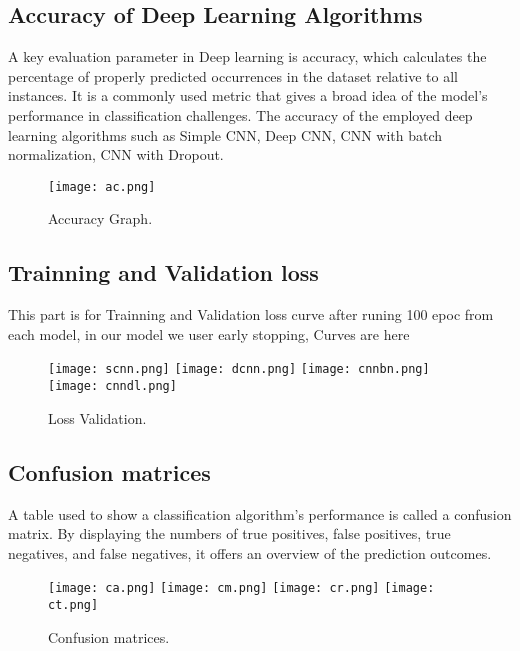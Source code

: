 \documentclass[conference]{IEEEtran}
\begin{document}
\subsection{Accuracy of Deep Learning Algorithms}
A key evaluation parameter in Deep learning is accuracy, which calculates the percentage of properly predicted occurrences in the dataset relative to all instances. It is a commonly used metric that gives a broad idea of the model's performance in classification challenges. The accuracy of the employed deep learning algorithms such as Simple CNN, Deep CNN, CNN with batch normalization, CNN with Dropout.

\begin{figure}[h]
  \centering
  \texttt{[image: ac.png]}
  \caption{Accuracy Graph.}
  \label{fig:your_label}
\end{figure}

\subsection{Trainning and Validation loss}
This part is for Trainning and Validation loss curve after runing 100 epoc from each model, in our model we user early stopping, Curves are here

\begin{figure}[h]
  \centering
  \texttt{[image: scnn.png]}
  \texttt{[image: dcnn.png]}
  \texttt{[image: cnnbn.png]}
  \texttt{[image: cnndl.png]}
  \caption{Loss Validation.}
  \label{fig:your_label}
\end{figure}

\subsection{Confusion matrices}

A table used to show a classification algorithm's performance is called a confusion matrix. By displaying the numbers of true positives, false positives, true negatives, and false negatives, it offers an overview of the prediction outcomes.

\begin{figure}[h]
  \centering
  \texttt{[image: ca.png]}
  \texttt{[image: cm.png]}
  \texttt{[image: cr.png]}
  \texttt{[image: ct.png]}
  \caption{Confusion matrices.}
  \label{fig:your_label}
\end{figure}
\end{document}
